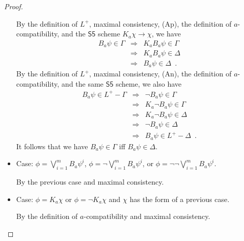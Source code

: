 \documentclass[12pt]{article}
\theoremstyle{definition}
\begin{document}
\begin{proof}
\begin{itemize}
    By the definition of $L^+$, maximal consistency, (Ap), the
    definition of $a$-compatibility, and the $\mathsf{S5}$ scheme
    $K_a\chi\to\chi$, we have
    \[
    \renewcommand{\arraystretch}{1.3}
    \begin{array}{lcl}
      B_a\psi\in \Gamma 
      & \Rightarrow &
      K_aB_a\psi\in \Gamma
      \\
      & \Rightarrow &
      K_aB_a\psi\in \Delta
      \\
      & \Rightarrow &
      B_a\psi\in \Delta\enspace.
    \end{array}
    \]
    By the definition of $L^+$, maximal consistency, (An), the
    definition of $a$-compatibility, and the same $\mathsf{S5}$
    scheme, we also have
    \[
    \renewcommand{\arraystretch}{1.3}
    \begin{array}{lcl}
      B_a\psi\in L^+-\Gamma 
      & \Rightarrow &
      \lnot B_a\psi\in \Gamma
      \\
      & \Rightarrow &
      K_a\lnot B_a\psi\in  \Gamma
      \\
      & \Rightarrow &
      K_a\lnot B_a\psi\in \Delta
      \\
      & \Rightarrow &
      \lnot B_a\psi\in \Delta
      \\
      & \Rightarrow &
      B_a\psi\in L^+-\Delta
      \enspace.
    \end{array}
    \]
    It follows that we have $B_a\psi\in\Gamma$ iff $B_a\psi\in\Delta$.

  \item Case: $\phi=\bigvee_{i=1}^m B_a\psi^i$, $\phi=\lnot\bigvee_{i=1}^m B_a\psi^i$, or 
    $\phi=\lnot\lnot\bigvee_{i=1}^m B_a\psi^i$.

    By the previous case and maximal consistency.

  \item Case: $\phi=K_a\chi$ or $\phi=\lnot K_a\chi$ and $\chi$ has
    the form of a previous case.

    By the definition of $a$-compatibility and maximal
    consistency. \qedhere
  \end{itemize}
\end{proof}
\end{document}
